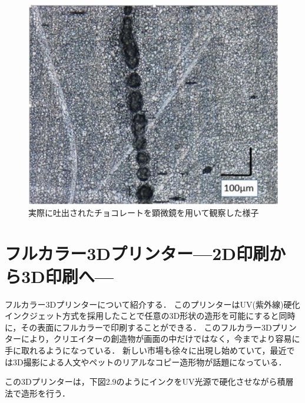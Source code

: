\begin{figure}[H]
  \centering
  \includegraphics[width=9truecm]{./fig/seidenn2.jpg}
  \caption{実際に吐出されたチョコレートを顕微鏡を用いて観察した様子}
  \label{fig:ferret}
\end{figure}


\section{フルカラー3Dプリンター—2D印刷から3D印刷へ—\cite{f}}
\label{sec:enum}
フルカラー3Dプリンターについて紹介する．
このプリンターはUV(紫外線)硬化インクジェット方式を採用したことで任意の3D形状の造形を可能にすると同時に，その表面にフルカラーで印刷することができる．
このフルカラー3Dプリンターにより，クリエイターの創造物が画面の中だけではなく，今までより容易に手に取れるようになっている．
新しい市場も徐々に出現し始めていて，最近では3D撮影による人文やペットのリアルなコピー造形物が話題になっている．

この3Dプリンターは，下図2.9のようにインクをUV光源で硬化させながら積層法で造形を行う．

